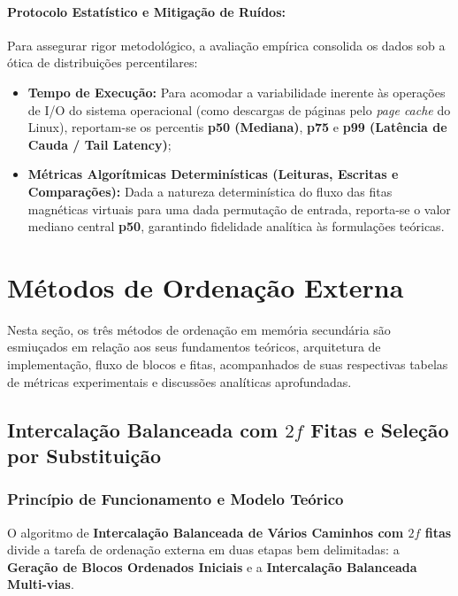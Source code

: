 \documentclass[12pt,a4paper]{article}
\begin{document}
\paragraph{Protocolo Estatístico e Mitigação de Ruídos:}
Para assegurar rigor metodológico, a avaliação empírica consolida os dados sob a ótica de distribuições percentilares:
\begin{itemize}
    \item \textbf{Tempo de Execução:} Para acomodar a variabilidade inerente às operações de I/O do sistema operacional (como descargas de páginas pelo \textit{page cache} do Linux), reportam-se os percentis \textbf{p50 (Mediana)}, \textbf{p75} e \textbf{p99 (Latência de Cauda / Tail Latency)};
    \item \textbf{Métricas Algorítmicas Determinísticas (Leituras, Escritas e Comparações):} Dada a natureza determinística do fluxo das fitas magnéticas virtuais para uma dada permutação de entrada, reporta-se o valor mediano central \textbf{p50}, garantindo fidelidade analítica às formulações teóricas.
\end{itemize}

\section{Métodos de Ordenação Externa}
\label{sec:metodos}

Nesta seção, os três métodos de ordenação em memória secundária são esmiuçados em relação aos seus fundamentos teóricos, arquitetura de implementação, fluxo de blocos e fitas, acompanhados de suas respectivas tabelas de métricas experimentais e discussões analíticas aprofundadas.

\subsection{Intercalação Balanceada com \texorpdfstring{$2f$}{2f} Fitas e Seleção por Substituição}
\label{subsec:metodo_2f}

\subsubsection{Princípio de Funcionamento e Modelo Teórico}
O algoritmo de \textbf{Intercalação Balanceada de Vários Caminhos com $2f$ fitas} divide a tarefa de ordenação externa em duas etapas bem delimitadas: a \textbf{Geração de Blocos Ordenados Iniciais} e a \textbf{Intercalação Balanceada Multi-vias}.
\end{document}
